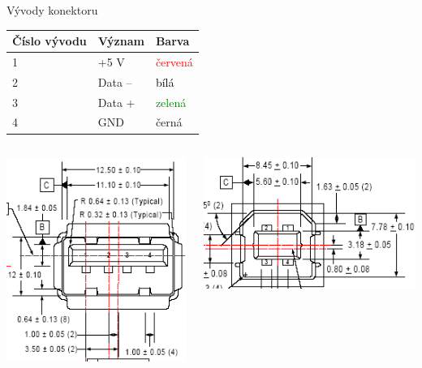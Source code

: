 \documentclass[aspectratio=43]{beamer}
\begin{document}
\begin{frame}{Vývody konektoru}
	\begin{table}
		\begin{tabular}{|l|l|l|}
			\hline
			\textbf{Číslo vývodu} & \textbf{Význam} & \textbf{Barva}             \\ \hline
			1                        & +5 V             & \textcolor{red}{červená} \\ \hline
			2                        & Data --          & \textcolor{black}{bílá}  \\ \hline
			3                        & Data +           & \textcolor{green}{zelená} \\ \hline
			4                        & GND              & černá                    \\ \hline
		\end{tabular}
	\end{table}
	
	\begin{columns}
		\begin{center}
			\includegraphics[width=0.7\linewidth]{extrahovane_obrazky/img_3_page4_9.png}
		\end{center}
		\begin{center}
			\includegraphics[width=1\linewidth]{extrahovane_obrazky/img_3_page4_10.png}
		\end{center}
	\end{columns}
\end{frame}
\end{document}
